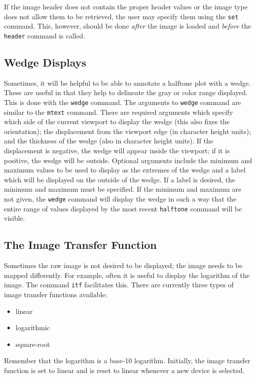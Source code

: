 If the image header does not contain the proper header values or the
image type does not allow them to be retrieved,
the user may specify them using the
{\tt set}%
command.
This, however, should be done {\em after} the image is loaded and
{\em before} the {\tt header} command is called.

\subsection*		{Wedge Displays}

Sometimes, it will be helpful to be able to annotate
a halftone plot with a wedge.
These are useful in that they help to delineate the gray or color
range displayed.
This is done with the
{\tt wedge}%
command.
The arguments to {\tt wedge} command are similar to the
{\tt mtext}%
command.
There are required arguments which specify which side of the current
viewport to display the wedge (this also fixes the orientation);
the displacement from the viewport edge (in character height units); and
the thickness of the wedge (also in character height units).
If the displacement is negative, the wedge will appear inside the viewport;
if it is positive, the wedge will be outside.
Optional arguments include the minimum and maximum values to be used to
display as the extremes of the wedge and a label which will be displayed
on the outside of the wedge.
If a label is desired, the minimum and maximum must be specified.
If the minimum and maximum are not given,
the {\tt wedge} command will display the wedge
in such a way that the entire range of values displayed by the most
recent {\tt halftone}%
%
command will be visible.

\subsection*		{The Image Transfer Function}

Sometimes the raw image is not desired to be displayed;
the image needs to be mapped differently.
For example, often it is useful to display the logarithm of the image.
The command
{\tt itf}%
facilitates this.
There are currently three types of image transfer functions available:
\begin{itemize}
  \item linear
  \item logarithmic
  \item square-root
\end{itemize}
Remember that the logarithm is a base-10 logarithm.
Initially, the image transfer function is set to linear and is
reset to linear whenever a new device is selected.

